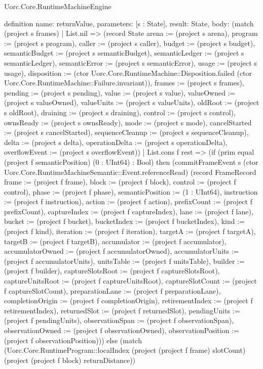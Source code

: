 \begin{lexlean}{Uorc.Core.RuntimeMachineEngine}
\begin{semanticmodule}
definition{
  name: returnValue,
  parameters: [s : State],
  result: State,
  body: (match (project s frames)
    | List.nil => (record State {arena := (project s arena), program := (project s program), caller := (project s caller), budget := (project s budget), semanticBudget := (project s semanticBudget), semanticLedger := (project s semanticLedger), semanticError := (project s semanticError), usage := (project s usage), disposition := (ctor Uorc.Core.RuntimeMachine::Disposition.failed (ctor Uorc.Core.RuntimeMachine::Failure.invariant)), frames := (project s frames), pending := (project s pending), value := (project s value), valueOwned := (project s valueOwned), valueUnits := (project s valueUnits), oldRoot := (project s oldRoot), draining := (project s draining), control := (project s control), ownsReady := (project s ownsReady), mode := (project s mode), cancelStarted := (project s cancelStarted), sequenceCleanup := (project s sequenceCleanup), delta := (project s delta), operationDelta := (project s operationDelta), overflowEvent := (project s overflowEvent)})
    | List.cons f rest => (if (prim equal (project f semanticPosition) (0 : UInt64) : Bool) then (commitFrameEvent s (ctor Uorc.Core.RuntimeMachineSemantic::Event.referenceRead) (record FrameRecord {frame := (project f frame), block := (project f block), control := (project f control), phase := (project f phase), semanticPosition := (1 : UInt64), instruction := (project f instruction), action := (project f action), prefixCount := (project f prefixCount), captureIndex := (project f captureIndex), lane := (project f lane), bucket := (project f bucket), bucketIndex := (project f bucketIndex), kind := (project f kind), iteration := (project f iteration), targetA := (project f targetA), targetB := (project f targetB), accumulator := (project f accumulator), accumulatorOwned := (project f accumulatorOwned), accumulatorUnits := (project f accumulatorUnits), unitsTable := (project f unitsTable), builder := (project f builder), captureSlotsRoot := (project f captureSlotsRoot), captureUnitsRoot := (project f captureUnitsRoot), captureSlotCount := (project f captureSlotCount), preparationLane := (project f preparationLane), completionOrigin := (project f completionOrigin), retirementIndex := (project f retirementIndex), returnedSlot := (project f returnedSlot), pendingUnits := (project f pendingUnits), observationSpan := (project f observationSpan), observationOwned := (project f observationOwned), observationPosition := (project f observationPosition)})) else (match (Uorc.Core.RuntimeProgram::localIndex (project (project f frame) slotCount) (project (project f block) returnDistance))
}
\end{semanticmodule}
\end{lexlean}
